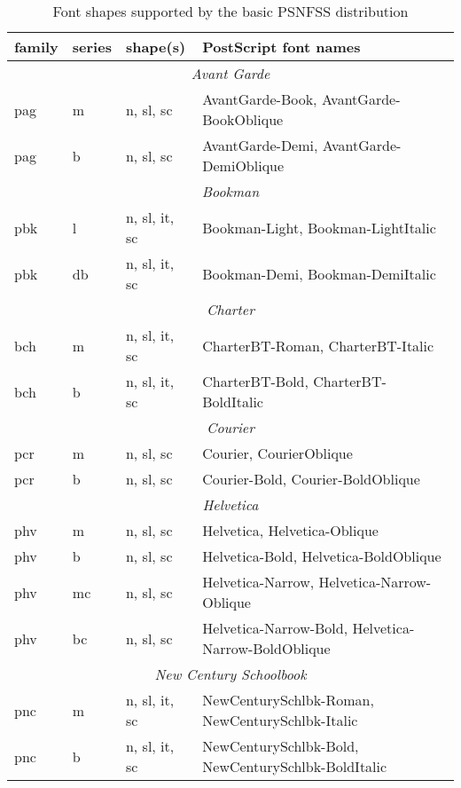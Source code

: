 \documentclass[11pt]{ltxguide}[1995/11/28]
\newcommand{\ps}{PostScript}
\begin{document}
\begin{table}[p]
  \caption{Font shapes supported by the basic PSNFSS distribution}
  \label{tab:families}
  \medskip

  {\small
  \begin{tabularx}{\linewidth}{|l|l|l|>{\raggedright\arraybackslash}X|}
  \hline
  \textbf{family} & \textbf{series} & \textbf{shape(s)} & \textbf{\ps{} font names}\\
  \hline\hline
  \multicolumn{4}{|c|}{\textit{Avant Garde}}\\ \hline
   pag & m & n, sl, sc & AvantGarde-Book, AvantGarde-BookOblique\\ \hline
   pag & b & n, sl, sc & AvantGarde-Demi, AvantGarde-DemiOblique\\ \hline \hline
  \multicolumn{4}{|c|}{\textit{Bookman}}\\ \hline
   pbk & l & n, sl, it, sc & Bookman-Light, Bookman-LightItalic\\ \hline
   pbk & db & n, sl, it, sc & Bookman-Demi, Bookman-DemiItalic\\ \hline \hline
  \multicolumn{4}{|c|}{\textit{Charter}}\\ \hline
   bch & m & n, sl, it, sc & CharterBT-Roman, CharterBT-Italic\\ \hline
   bch & b & n, sl, it, sc & CharterBT-Bold, CharterBT-BoldItalic\\ \hline \hline
  \multicolumn{4}{|c|}{\textit{Courier}}\\ \hline
   pcr & m & n, sl, sc & Courier, CourierOblique\\ \hline
   pcr & b & n, sl, sc & Courier-Bold, Courier-BoldOblique\\ \hline \hline
  \multicolumn{4}{|c|}{\textit{Helvetica}}\\ \hline
   phv & m & n, sl, sc & Helvetica, Helvetica-Oblique\\ \hline
   phv & b & n, sl, sc & Helvetica-Bold, Helvetica-BoldOblique\\ \hline
   phv & mc & n, sl, sc & Helvetica-Narrow, Helvetica-Narrow-Oblique\\ \hline
   phv & bc & n, sl, sc & Helvetica-Narrow-Bold, Helvetica-Narrow-BoldOblique\\\hline \hline
  \multicolumn{4}{|c|}{\textit{New Century Schoolbook}}\\ \hline
   pnc & m & n, sl, it, sc & NewCenturySchlbk-Roman, NewCenturySchlbk-Italic\\ \hline
   pnc & b & n, sl, it, sc & NewCenturySchlbk-Bold, NewCenturySchlbk-BoldItalic\\ \hline \hline

\end{tabularx}}
\end{table}
\end{document}
